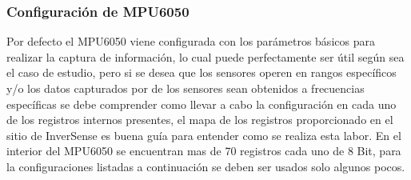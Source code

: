 \documentclass[12pt,a4paper]{article}
\begin{document}
\subsubsection{Configuración de MPU6050}
Por defecto el MPU6050 viene configurada con los parámetros básicos para realizar la captura de información, lo cual puede perfectamente ser útil según sea el caso de estudio, pero si se desea que los sensores operen en rangos específicos y/o los datos capturados por de los sensores sean obtenidos a frecuencias específicas se debe comprender como llevar a cabo la configuración en cada uno de los registros internos presentes, el mapa de los registros \cite{MAPREGISTER} proporcionado  en el sitio de InverSense es buena guía para entender como se realiza esta labor.
\newline En el interior del MPU6050 se encuentran mas de 70 registros cada uno de 8 Bit, para la configuraciones listadas a continuación se deben ser usados solo algunos pocos.
\end{document}
